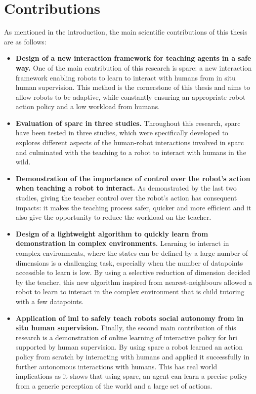 \section{Contributions}\label{sec:conc_contribution}
As mentioned in the introduction, the main scientific contributions of this thesis are as follows:
\begin{itemize}
	\item \textbf{Design of a new interaction framework for teaching agents in a safe way.} One of the main contribution of this research is \gls{sparc}: a new interaction framework enabling robots to learn to interact with humans from in situ human supervision. This method is the cornerstone of this thesis and aims to allow robots to be adaptive, while constantly ensuring an appropriate robot action policy and a low workload from humans.
	
	\item \textbf{Evaluation of \gls{sparc} in three studies.} Throughout this research, \gls{sparc} have been tested in three studies, which were specifically developed to explores different aspects of the human-robot interactions involved in \gls{sparc} and culminated with the teaching to a robot to interact with humans in the wild.
	
	\item \textbf{Demonstration of the importance of control over the robot's action when teaching a robot to interact.} As demonstrated by the last two studies, giving the teacher control over the robot's action has consequent impacts: it makes the teaching process safer, quicker and more efficient and it also give the opportunity to reduce the workload on the teacher.
	
	\item \textbf{Design of a lightweight algorithm to quickly learn from demonstration in complex environments.} Learning to interact in complex environments, where the states can be defined by a large number of dimensions is a challenging task, especially when the number of datapoints accessible to learn is low. By using a selective reduction of dimension decided by the teacher, this new algorithm inspired from nearest-neighbours allowed a robot to learn to interact in the complex environment that is child tutoring with a few datapoints. 
	
	\item \textbf{Application of \gls{iml} to safely teach robots social autonomy from in situ human supervision.} Finally, the second main contribution of this research is a demonstration of online learning of interactive policy for \gls{hri} supported by human supervision. By using \gls{sparc} a robot learned an action policy from scratch by interacting with humans and applied it successfully in further autonomous interactions with humans. This has real world implications as it shows that using \gls{sparc}, an agent can learn a precise policy from a generic perception of the world and a large set of actions. 
	

\end{itemize}
